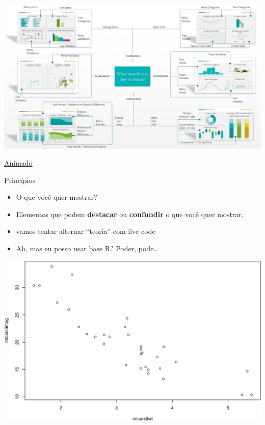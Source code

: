 \documentclass[
  9pt,
  ignorenonframetext,
]{beamer}
\newenvironment{Shaded}{\begin{snugshade}}{\end{snugshade}}
\newcommand{\KeywordTok}[1]{\textcolor[rgb]{0.13,0.29,0.53}{\textbf{#1}}}
\newcommand{\NormalTok}[1]{#1}
\newcommand{\OperatorTok}[1]{\textcolor[rgb]{0.81,0.36,0.00}{\textbf{#1}}}
\begin{document}
\begin{frame}{}
\protect\hypertarget{section-1}{}
\href{https://www.techprevue.com/decision-tree-perfect-visualisation-data/}{\includegraphics{imgs/abela-chart-chooser.jpg}}

\href{https://www.youtube.com/watch?v=00zjDdXUcy4}{Animado}
\end{frame}

\begin{frame}{Princípios}
\protect\hypertarget{princuxedpios}{}
\begin{itemize}
\item
  O que você quer mostrar?
\item
  Elementos que podem \textbf{destacar} ou \textbf{confundir} o que você
  quer mostrar.
\item
  vamos tentar alternar ``teoria'' com live code
\item
  Ah, mas eu posso usar base R? Poder, pode\ldots{}
\end{itemize}
\end{frame}

\begin{frame}[fragile]{}
\protect\hypertarget{section-2}{}
\begin{Shaded}
\end{Shaded}

\includegraphics{aula_06_files/figure-beamer/unnamed-chunk-2-1.pdf}
\end{frame}
\end{document}

